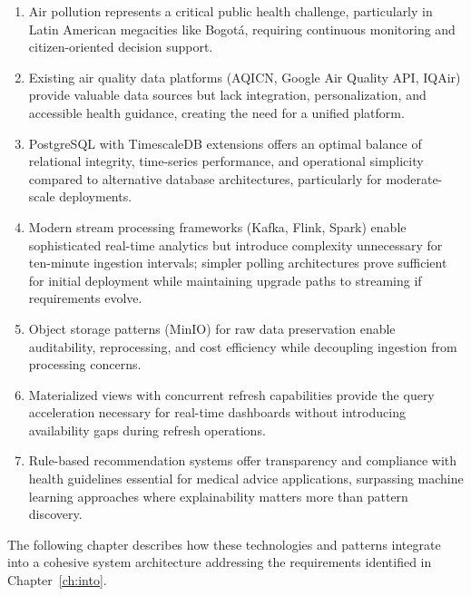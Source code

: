 \begin{enumerate}
    \item Air pollution represents a critical public health challenge, particularly in Latin American megacities like Bogotá, requiring continuous monitoring and citizen-oriented decision support.
    
    \item Existing air quality data platforms (AQICN, Google Air Quality API, IQAir) provide valuable data sources but lack integration, personalization, and accessible health guidance, creating the need for a unified platform.
    
    \item PostgreSQL with TimescaleDB extensions offers an optimal balance of relational integrity, time-series performance, and operational simplicity compared to alternative database architectures, particularly for moderate-scale deployments.
    
    \item Modern stream processing frameworks (Kafka, Flink, Spark) enable sophisticated real-time analytics but introduce complexity unnecessary for ten-minute ingestion intervals; simpler polling architectures prove sufficient for initial deployment while maintaining upgrade paths to streaming if requirements evolve.
    
    \item Object storage patterns (MinIO) for raw data preservation enable auditability, reprocessing, and cost efficiency while decoupling ingestion from processing concerns.
    
    \item Materialized views with concurrent refresh capabilities provide the query acceleration necessary for real-time dashboards without introducing availability gaps during refresh operations.
    
    \item Rule-based recommendation systems offer transparency and compliance with health guidelines essential for medical advice applications, surpassing machine learning approaches where explainability matters more than pattern discovery.
\end{enumerate}

The following chapter describes how these technologies and patterns integrate into a cohesive system architecture addressing the requirements identified in Chapter~\ref{ch:into}.
